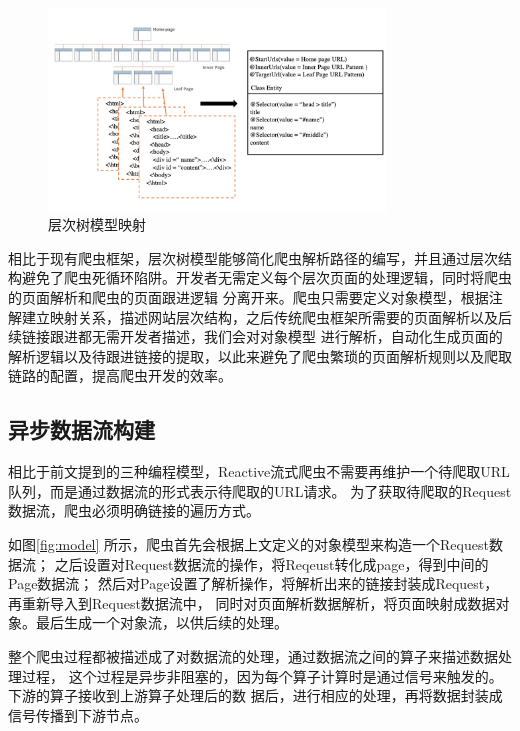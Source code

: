 \documentclass[master]{njuthesis}
\begin{document}
\begin{figure}[htbp]{}
\centering
\includegraphics[width= 0.8\textwidth]{pic/mapper.png}
\caption{层次树模型映射}\label{fig:mapper}
\end{figure}

相比于现有爬虫框架，层次树模型能够简化爬虫解析路径的编写，并且通过层次结构避免了爬虫死循环陷阱。开发者无需定义每个层次页面的处理逻辑，同时将爬虫的页面解析和爬虫的页面跟进逻辑
分离开来。爬虫只需要定义对象模型，根据注解建立映射关系，描述网站层次结构，之后传统爬虫框架所需要的页面解析以及后续链接跟进都无需开发者描述，我们会对对象模型
进行解析，自动化生成页面的解析逻辑以及待跟进链接的提取，以此来避免了爬虫繁琐的页面解析规则以及爬取链路的配置，提高爬虫开发的效率。

\subsection{异步数据流构建}
相比于前文提到的三种编程模型，Reactive流式爬虫不需要再维护一个待爬取URL队列，而是通过数据流的形式表示待爬取的URL请求。
为了获取待爬取的Request数据流，爬虫必须明确链接的遍历方式。

如图\ref{fig:model} 所示，爬虫首先会根据上文定义的对象模型来构造一个Request数据流；
之后设置对Request数据流的操作，将Reqeust转化成page，得到中间的Page数据流；
然后对Page设置了解析操作，将解析出来的链接封装成Request，再重新导入到Request数据流中，
同时对页面解析数据解析，将页面映射成数据对象。最后生成一个对象流，以供后续的处理。

整个爬虫过程都被描述成了对数据流的处理，通过数据流之间的算子来描述数据处理过程，
这个过程是异步非阻塞的，因为每个算子计算时是通过信号来触发的。下游的算子接收到上游算子处理后的数
据后，进行相应的处理，再将数据封装成信号传播到下游节点。
\end{document}
